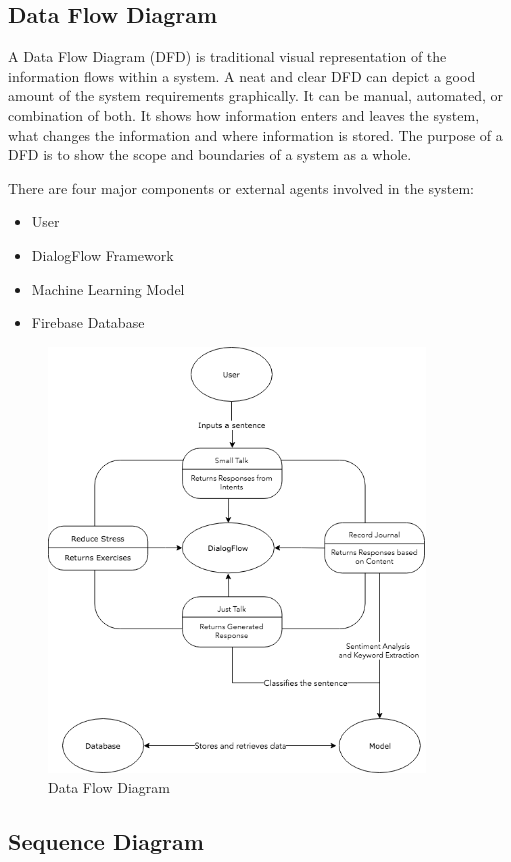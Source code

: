 \subsection{Data Flow Diagram}

A Data Flow Diagram (DFD) is traditional visual representation of the information flows within a system. A neat and clear DFD can depict a good amount of the system requirements graphically. It can be manual, automated, or combination of both. It shows how information enters and leaves the system, what changes the information and where information is stored. The purpose of a DFD is to show the scope and boundaries of a system as a whole.

There are four major components or external agents involved in the system:
\begin{itemize}
    \item User
    \item DialogFlow Framework
    \item Machine Learning Model
    \item Firebase Database
\end{itemize}

\begin{figure}[H]
    \centering
    \includegraphics[width=10cm]{images/data-flow-diagram.png}
    \caption{Data Flow Diagram}
\end{figure}

\pagebreak

\subsection{Sequence Diagram}

